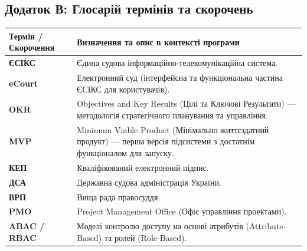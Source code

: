 \documentclass{article}
\begin{document}
\subsection{Додаток В: Глосарій термінів та скорочень}
\begin{longtable}{@{}p{3.5cm}p{10.7cm}@{}}
\toprule
\textbf{Термін / Скорочення} & \textbf{Визначення та опис в контексті програми} \\
\midrule
\textbf{ЄСІКС} & Єдина судова інформаційно-телекомунікаційна система. \\
\textbf{eCourt} & Електронний суд (інтерфейсна та функціональна частина ЄСІКС для користувачів). \\
\textbf{OKR} & Objectives and Key Results (Цілі та Ключові Результати) --- методологія стратегічного планування та управління. \\
\textbf{MVP} & Minimum Viable Product (Мінімально життєздатний продукт) --- перша версія підсистеми з достатнім функціоналом для запуску. \\
\textbf{КЕП} & Кваліфікований електронний підпис. \\
\textbf{ДСА} & Державна судова адміністрація України. \\
\textbf{ВРП} & Вища рада правосуддя. \\
\textbf{PMO} & Project Management Office (Офіс управління проектами). \\
\textbf{ABAC / RBAC} & Моделі контролю доступу на основі атрибутів (Attribute-Based) та ролей (Role-Based). \\
\bottomrule
\end{longtable}
\end{document}
